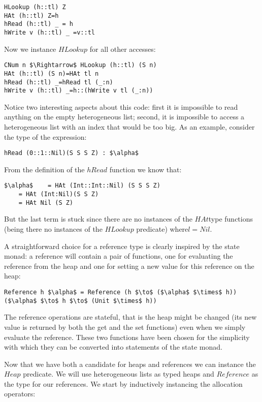 \documentclass[a4paper]{article}
\begin{document}
\begin{lstlisting}
HLookup (h::tl) Z
HAt (h::tl) Z=h
hRead (h::tl) _ = h
hWrite v (h::tl) _ =v::tl
\end{lstlisting}

Now we instance $HLookup$ for all other accesses:

\begin{lstlisting}
CNum n $\Rightarrow$ HLookup (h::tl) (S n)
HAt (h::tl) (S n)=HAt tl n
hRead (h::tl) _=hRead tl (_:n)
hWrite v (h::tl) _=h::(hWrite v tl (_:n))
\end{lstlisting}

Notice two interesting aspects about this code: first it is impossible to read anything on the empty heterogeneous list; second, it is impossible to access a heterogeneous list with an index that would be too big. As an example, consider the type of the expression:

\begin{lstlisting}
hRead (0::1::Nil)(S S S Z) : $\alpha$
\end{lstlisting}

From the definition of the $hRead$ function we know that:

\begin{lstlisting}
$\alpha$ 	= HAt (Int::Int::Nil) (S S S Z)
	= HAt (Int:Nil)(S S Z)
	= HAt Nil (S Z)
\end{lstlisting}

But the last term is stuck since there are no instances of the $HAt $type functions (being there no instances of the $HLookup$ predicate) where$ l=Nil$.

\noindent A straightforward choice for a reference type is clearly inspired by the state monad: a reference will contain a pair of functions, one for evaluating the reference from the heap and one for setting a new value for this reference on the heap:

\begin{lstlisting}
Reference h $\alpha$ = Reference (h $\to$ ($\alpha$ $\times$ h)) ($\alpha$ $\to$ h $\to$ (Unit $\times$ h))
\end{lstlisting}

The reference operations are stateful, that is the heap might be changed (its new value is returned by both the get and the set functions) even when we simply evaluate the reference. These two functions have been chosen for the simplicity with which they can be converted into statements of the state monad.

\noindent Now that we have both a candidate for heaps and references we can instance the $Heap$ predicate. We will use heterogeneous lists as typed heaps and $Reference$ as the type for our references. We start by inductively instancing the allocation operators:
\end{document}
